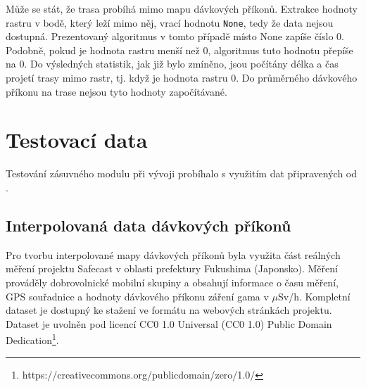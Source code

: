 		\begin{algorithm}                     
		\begin{algorithmic} [1]  

			\ELSE
			\ENDIF			
			
			\ENDIF
		\ENDFOR
		
	\end{algorithmic}
\end{algorithm}     

Může se stát, že trasa probíhá mimo mapu dávkových příkonů. Extrakce hodnoty rastru v bodě, který leží mimo něj, vrací hodnotu \texttt{None}, tedy že data nejsou dostupná. Prezentovaný algoritmus v tomto případě místo None zapíše číslo 0. Podobně, pokud je hodnota rastru menší než 0, algoritmus tuto hodnotu přepíše na 0. Do výsledných statistik, jak již bylo zmíněno, jsou počítány délka a čas projetí trasy mimo rastr, tj. když je hodnota rastru 0. Do průměrného dávkového příkonu na trase nejsou tyto hodnoty započítávané. 


\section{Testovací data}
Testování zásuvného modulu při vývoji probíhalo s využitím dat připravených od .

\subsection{Interpolovaná data dávkových příkonů}
Pro tvorbu interpolované mapy dávkových příkonů byla využita část reálných měření projektu Safecast v oblasti prefektury Fukushima (Japonsko). Měření prováděly dobrovolnické mobilní skupiny a obsahují informace o času měření, GPS souřadnice a hodnoty dávkového příkonu záření gama v $\mu$Sv/h. Kompletní dataset je dostupný ke stažení ve formátu  na webových stránkách projektu. Dataset je uvolněn pod licencí CC0 1.0 Universal (CC0 1.0) Public Domain Dedication\footnote{https://creativecommons.org/publicdomain/zero/1.0/}. 

